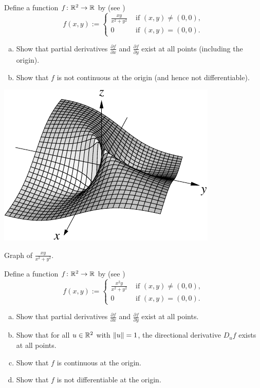 \begin{exercise} \label{exercise:noncontpartialsexist}
Define a function $f \colon {\mathbb{R}}^2 \to {\mathbb{R}}$ by
(see )
\begin{equation*}
f(x,y)
:=
\begin{cases}
\frac{xy}{x^2+y^2} & \text{ if $(x,y) \not= (0,0)$}, \\
0 & \text{ if $(x,y) = (0,0)$}.
\end{cases}
\end{equation*}
\begin{enumerate}[a)]
\item
Show that partial derivatives 
$\frac{\partial f}{\partial x}$ and
$\frac{\partial f}{\partial y}$ exist at all points (including the origin).
\item
Show that $f$ is not continuous at the origin (and hence not
differentiable).
\end{enumerate}
\end{exercise}

\begin{myfigureht}
\includegraphics{figures/xyxsqysq}
\caption{Graph of $\frac{xy}{x^2+y^2}$.\label{fig:xyxsqysqvol2}}
\end{myfigureht}

\begin{samepage}
\begin{exercise}
Define a function $f \colon {\mathbb{R}}^2 \to {\mathbb{R}}$ by
(see )
\begin{equation*}
f(x,y)
:=
\begin{cases}
\frac{x^2y}{x^2+y^2} & \text{ if $(x,y) \not= (0,0)$}, \\
0 & \text{ if $(x,y) = (0,0)$}.
\end{cases}
\end{equation*}
\begin{enumerate}[a)]
\item
Show that partial derivatives 
$\frac{\partial f}{\partial x}$ and
$\frac{\partial f}{\partial y}$ exist at all points.
\item
Show that for all $u \in {\mathbb{R}}^2$ with $\lVert {u} \rVert=1$, the directional
derivative $D_u f$ exists at all points.
\item
Show that $f$ is continuous at the origin.
\item
Show that $f$ is not differentiable at the origin.
\end{enumerate}
\end{exercise}
\end{samepage}

